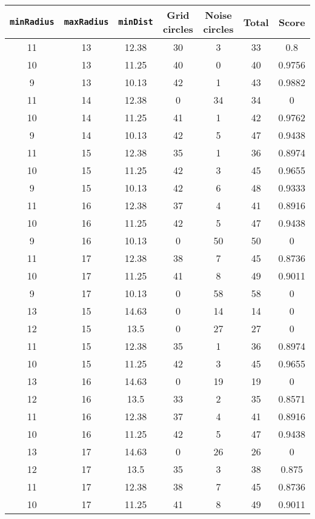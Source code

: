 \documentclass[letterpaper, 12pt]{article}
\begin{document}
\begin{longtable}{|c|c|c|c|c|c|c|}
\hline
\textbf{\texttt{minRadius}} & \textbf{\texttt{maxRadius}} & \textbf{\texttt{minDist}} & \textbf{Grid circles} & \textbf{Noise circles} & \textbf{Total} & \textbf{Score} \\
\hline
11 & 13 & 12.38 & 30 & 3 & 33 & 0.8 \\
\hline
10 & 13 & 11.25 & 40 & 0 & 40 & 0.9756 \\
\hline
9 & 13 & 10.13 & 42 & 1 & 43 & 0.9882 \\
\hline
11 & 14 & 12.38 & 0 & 34 & 34 & 0 \\
\hline
10 & 14 & 11.25 & 41 & 1 & 42 & 0.9762 \\
\hline
9 & 14 & 10.13 & 42 & 5 & 47 & 0.9438 \\
\hline
11 & 15 & 12.38 & 35 & 1 & 36 & 0.8974 \\
\hline
10 & 15 & 11.25 & 42 & 3 & 45 & 0.9655 \\
\hline
9 & 15 & 10.13 & 42 & 6 & 48 & 0.9333 \\
\hline
11 & 16 & 12.38 & 37 & 4 & 41 & 0.8916 \\
\hline
10 & 16 & 11.25 & 42 & 5 & 47 & 0.9438 \\
\hline
9 & 16 & 10.13 & 0 & 50 & 50 & 0 \\
\hline
11 & 17 & 12.38 & 38 & 7 & 45 & 0.8736 \\
\hline
10 & 17 & 11.25 & 41 & 8 & 49 & 0.9011 \\
\hline
9 & 17 & 10.13 & 0 & 58 & 58 & 0 \\
\hline
13 & 15 & 14.63 & 0 & 14 & 14 & 0 \\
\hline
12 & 15 & 13.5 & 0 & 27 & 27 & 0 \\
\hline
11 & 15 & 12.38 & 35 & 1 & 36 & 0.8974 \\
\hline
10 & 15 & 11.25 & 42 & 3 & 45 & 0.9655 \\
\hline
13 & 16 & 14.63 & 0 & 19 & 19 & 0 \\
\hline
12 & 16 & 13.5 & 33 & 2 & 35 & 0.8571 \\
\hline
11 & 16 & 12.38 & 37 & 4 & 41 & 0.8916 \\
\hline
10 & 16 & 11.25 & 42 & 5 & 47 & 0.9438 \\
\hline
13 & 17 & 14.63 & 0 & 26 & 26 & 0 \\
\hline
12 & 17 & 13.5 & 35 & 3 & 38 & 0.875 \\
\hline
11 & 17 & 12.38 & 38 & 7 & 45 & 0.8736 \\
\hline
10 & 17 & 11.25 & 41 & 8 & 49 & 0.9011 \\

\end{longtable}
\end{document}
